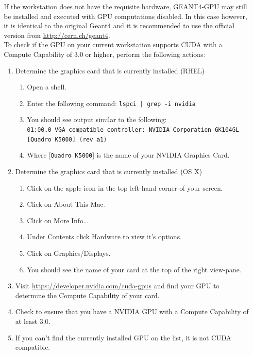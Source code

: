 \documentclass[12pt]{article}
\begin{document}
If the workstation does not have the requisite hardware, GEANT4-GPU may still be installed and executed with GPU computations disabled. In this case however, it is identical to the original Geant4 and it is recommended to use the official version from \url{http://cern.ch/geant4}.\\

To check if the GPU on your current workstation supports CUDA with a Compute Capability of 3.0 or higher, perform the following actions:\\

\begin{enumerate}
\item Determine the graphics card that is currently installed (RHEL)
\begin{enumerate}
\item Open a shell.
\item Enter the following command: \texttt{lspci | grep -i nvidia}
\item You should see output similar to the following:\\
\texttt{01:00.0 VGA compatible controller: NVIDIA Corporation GK104GL}\\
\texttt{[Quadro K5000] (rev a1)}
\item Where [\texttt{Quadro K5000}] is the name of your NVIDIA Graphics Card.
\end{enumerate}

\item Determine the graphics card that is currently installed (OS X)
\begin{enumerate}
\item Click on the apple icon in the top left-hand corner of your screen.
\item Click on About This Mac.
\item Click on More Info...
\item Under Contents click Hardware to view it's options.
\item Click on Graphics/Displays.
\item You should see the name of your card at the top of the right view-pane.
\end{enumerate}

\item Visit \url{https://developer.nvidia.com/cuda-gpus} and find your GPU to determine the Compute Capability of your card.
\item Check to ensure that you have a NVIDIA GPU with a  Compute Capability of at least 3.0.
\item If you can't find the currently installed GPU on the list, it is not CUDA compatible.
\end{enumerate}
\end{document}
